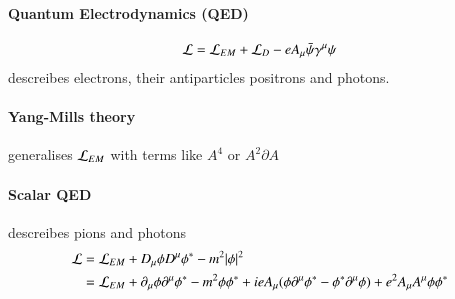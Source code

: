 \paragraph{Quantum Electrodynamics (QED)}
\begin{align}
	\mathcal{L} = \mathcal{L}_{EM} + \mathcal{L}_{D} - eA_\mu \bar{\psi} \gamma^\mu \psi
\end{align}
descreibes electrons, their antiparticles positrons and photons.

\paragraph{Yang-Mills theory}
generalises $\mathcal{L}_{EM}$ with terms like $A^4$ or $A^2 \partial A$
\paragraph{Scalar QED}
descreibes pions and photons
\begin{align}
	\begin{split}
		\mathcal{L} &= \mathcal{L}_{EM} + D_\mu \phi D^\mu\phi^* - m^2 |\phi|^2 \\
			 &= \mathcal{L}_{EM} + \partial_\mu\phi\partial^\mu\phi^* - m^2 \phi\phi^* + ie A_\mu(\phi\partial^\mu\phi^* - \phi^* \partial^\mu\phi) + e^2 A_\mu A^\mu \phi\phi^*
	\end{split}
\end{align}
